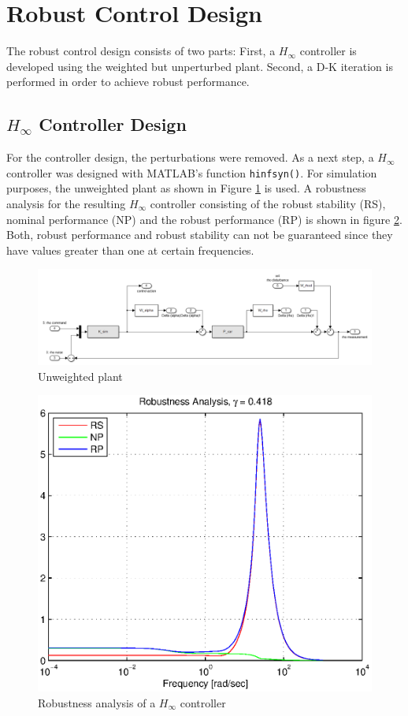 \documentclass[conference]{IEEEtran}
\begin{document}
\section{Robust Control Design}

The robust control design consists of two parts: First, a $H_{\infty}$ controller is developed using the weighted but unperturbed plant. Second, a D-K iteration is performed in order to achieve robust performance.

\subsection{$H_{\infty}$ Controller Design}

For the controller design, the perturbations were removed. As a next step, a $H_{\infty}$ controller was designed with \textsc{MATLAB}'s function \texttt{hinfsyn()}. For simulation purposes, the unweighted plant as shown in Figure \ref{figure:model_car_unweighted} is used. A robustness analysis for the resulting $H_{\infty}$ controller consisting of the robust stability (RS), nominal performance (NP) and the robust performance (RP) is shown in figure \ref{figure:RP_before_DK}. Both, robust performance and robust stability can not be guaranteed since they have values greater than one at certain frequencies.

\begin{figure}[h]
\centering
  \includegraphics[width=.47\textwidth]{pics/model_car_unweighted.png} 
  \caption{Unweighted plant}  
  \label{figure:model_car_unweighted}
\end{figure}


\begin{figure}[h]
\centering
  \includegraphics[width=.47\textwidth]{pics/RP_before_DK} 
  \caption{Robustness analysis of a $H_{\infty}$ controller}  
  \label{figure:RP_before_DK}
\end{figure}
\end{document}
